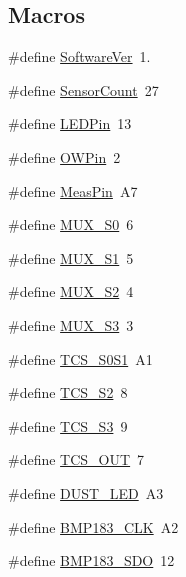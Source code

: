 \subsection*{Macros}
\begin{DoxyCompactItemize}
\item 
\#define \hyperlink{OWGeneric__SensorStation_8ino_a53a52b67d1aadf20dbeb5907cf7e86c7}{Software\-Ver}~1.
\item 
\#define \hyperlink{OWGeneric__SensorStation_8ino_ab8efc8d6fc0797bbfe99a0797dd59029}{Sensor\-Count}~27
\item 
\#define \hyperlink{OWGeneric__SensorStation_8ino_abd966e26c1237652c6c1dc46a8f14203}{L\-E\-D\-Pin}~13
\item 
\#define \hyperlink{OWGeneric__SensorStation_8ino_a7f5aa1ac0711ae18877a165a9bf24625}{O\-W\-Pin}~2
\item 
\#define \hyperlink{OWGeneric__SensorStation_8ino_a46bfd454f3dcedfc61d37a8dd954fa74}{Meas\-Pin}~A7
\item 
\#define \hyperlink{OWGeneric__SensorStation_8ino_a48db864f229e45ff129d71723d9f633e}{M\-U\-X\-\_\-\-S0}~6
\item 
\#define \hyperlink{OWGeneric__SensorStation_8ino_a4cd476538a9883cf5346d61ea5951c7b}{M\-U\-X\-\_\-\-S1}~5
\item 
\#define \hyperlink{OWGeneric__SensorStation_8ino_a19bf2fd37ec8cfdd994f6fe79302de36}{M\-U\-X\-\_\-\-S2}~4
\item 
\#define \hyperlink{OWGeneric__SensorStation_8ino_a7ba15d428477b37f67a965bd059208cf}{M\-U\-X\-\_\-\-S3}~3
\item 
\#define \hyperlink{OWGeneric__SensorStation_8ino_a04301d855ba0d6c7f01c03a071a735ca}{T\-C\-S\-\_\-\-S0\-S1}~A1
\item 
\#define \hyperlink{OWGeneric__SensorStation_8ino_af43d62169125e63d4338df237fbef7f3}{T\-C\-S\-\_\-\-S2}~8
\item 
\#define \hyperlink{OWGeneric__SensorStation_8ino_a56c62c8cc00d42e68c789467d666f7ea}{T\-C\-S\-\_\-\-S3}~9
\item 
\#define \hyperlink{OWGeneric__SensorStation_8ino_a519f4135221f6f2579429e0b05e2a12c}{T\-C\-S\-\_\-\-O\-U\-T}~7
\item 
\#define \hyperlink{OWGeneric__SensorStation_8ino_ad3c04d082154f2d617d706d13200782f}{D\-U\-S\-T\-\_\-\-L\-E\-D}~A3
\item 
\#define \hyperlink{OWGeneric__SensorStation_8ino_a65321e8415f3d7eaec3b1889ae61842f}{B\-M\-P183\-\_\-\-C\-L\-K}~A2
\item 
\#define \hyperlink{OWGeneric__SensorStation_8ino_a125fbe56052c13ea3123006b461575bc}{B\-M\-P183\-\_\-\-S\-D\-O}~12

\end{DoxyCompactItemize}
